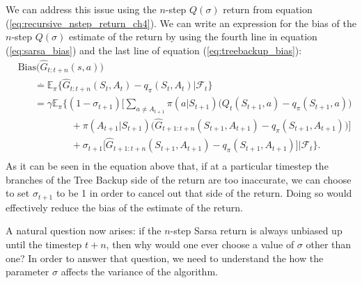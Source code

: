We can address this issue using the $n$-step $Q(\sigma)$ return from equation (\ref{eq:recursive_nstep_return_ch4}).
We can write an expression for the bias of the $n$-step $Q(\sigma)$ estimate of the return by using the fourth line in equation (\ref{eq:sarsa_bias}) and the last line of equation (\ref{eq:treebackup_bias}):
\begin{align}
\label{eq:qsigma_bias}
    & \text{Bias}\big(  \hat{G}_{t:t+n}(s, a)  \big) 
        \nonumber \\
    & \hspace{20pt} \overset{.}{=}
        \mathbb{E}_\pi \{ \hat{G}_{t:t+n}(S_t, A_t) - q_\pi (S_t, A_t) | \mathcal{F}_t \} 
        \nonumber \\
    & \hspace{20pt} =
        \gamma \mathbb{E}_\pi \Big\{
        (1-\sigma_{t+1}) \Big[\sum_{a \neq A_{t+1}} \pi(a|S_{t+1}) \big( Q_t(S_{t+1}, a) - q_\pi(S_{t+1}, a) \big)
        \nonumber \\
    & \hspace{65pt}
        + \pi(A_{t+1}|S_{t+1}) \big( \hat{G}_{t+1:t+n}(S_{t+1}, A_{t+1}) 
        - q_\pi(S_{t+1}, A_{t+1}) \big) \Big]
        \nonumber \\
    & \hspace{65pt} + 
        \sigma_{t+1} \Big[ \hat{G}_{t+1:t+n}(S_{t+1}, A_{t+1}) - q_\pi (S_{t+1}, A_{t+1}) \Big]
        \Big| \mathcal{F}_t \Big\}.
        \nonumber \\
\end{align}
%
As it can be seen in the equation above that, if at a particular timestep the branches of the Tree Backup side of the return are too inaccurate, we can choose to set $\sigma_{t+1}$ to be 1 in order to cancel out that side of the return.
Doing so would effectively reduce the bias of the estimate of the return.

A natural question now arises: if the $n$-step Sarsa return is always unbiased up until the timestep $t+n$, then why would one ever choose a value of $\sigma$ other than one?
In order to answer that question, we need to understand the how the parameter $\sigma$ affects the variance of the algorithm.

